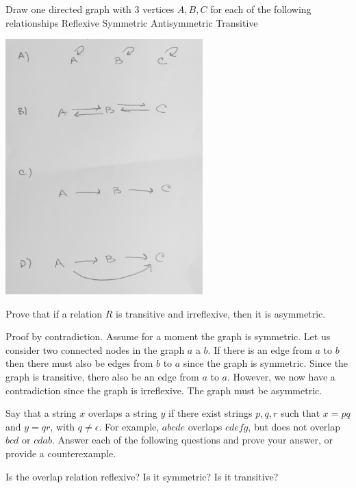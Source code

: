 \documentclass[solution, letterpaper]{cs20inclass}
\begin{document}
\problem
Draw one directed graph with 3 vertices $A, B, C$ for each of the following relationships
\subproblem Reflexive
\subproblem Symmetric
\subproblem Antisymmetric
\subproblem Transitive


\begin{solution}
\includegraphics[width=3in]{3NodeGraphs.jpg}



\end{solution}

\problem
Prove that if a relation $R$ is transitive and irreflexive, then it is asymmetric.

\begin{solution}
Proof by contradiction. Assume for a moment the graph is symmetric. Let us consider two connected nodes in the graph $a$ a $b$. If there is an edge from $a$ to $b$  then there must also be edges from $b$ to $a$ since the graph is symmetric. Since the graph is transitive, there also be an edge from $a$ to $a$. However, we now have a contradiction since the graph is irreflexive. The graph must be asymmetric. 


\end{solution}

\problem Say that a string $x$ overlaps a string $y$ if there exist strings $p,q,r$ such that $x = pq$ and $y = qr$, with $q \neq \epsilon$. For example, $abcde$ overlaps $cdefg$, but does not overlap $bcd$ or $cdab$. Answer each of the following questions and prove your answer, or provide a counterexample.

\subproblem Is the overlap relation reflexive? 
\subproblem Is it symmetric?
\subproblem Is it transitive?
\end{document}
